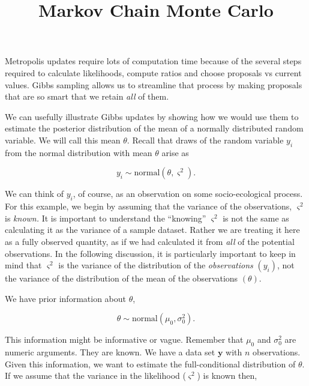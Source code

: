 \documentclass[11pt]{article}
\begin{document}
\title{Markov Chain Monte Carlo}

\maketitle

Metropolis updates require lots of computation time because of the several steps required to calculate likelihoods, compute ratios and choose proposals vs current values. Gibbs sampling allows us to streamline that process by making proposals that are so smart that we retain \emph{all }of them. 

We can usefully illustrate Gibbs updates by showing how we would use them to estimate the posterior distribution of the mean of a normally distributed random variable. We will call this mean $\theta$. Recall that draws of the random variable $y_{i}$ from the normal distribution with mean $\theta$ arise as  

\begin{equation}
y_{i}\sim\text{normal}(\theta,\varsigma^{2}).
\end{equation}

We can think of $y_{i}$, of course, as an observation on some socio-ecological process. For this example, we begin by assuming that the variance of the observations, $\varsigma^{2}$ is \emph{known. }It is important to understand the ``knowing'' $\varsigma^{2}$ is not the same as calculating it as the variance of a sample dataset. Rather we are
treating it here as a fully observed quantity, as if we had calculated it from \emph{all} of the potential observations. In the following discussion, it is particularly important to keep in mind that $\varsigma^{2}$ is the variance of the distribution of the \emph{observations} $\left(y_{i}\right)$, not the variance of the distribution of the mean of the observations
$\left(\theta\right)$.

We have prior information about $\theta$,

\begin{equation}
\theta\sim\text{normal}\left(\mu_{0},\sigma_{0}^{2}\right).
\end{equation}

This information might be informative or vague. Remember that $\mu_{0}$ and $\sigma_{0}^{2}$ are numeric arguments. They are known. We have a data set\textbf{ $\mathbf{y}$ }with $n$ observations. Given this information, we want to estimate the full-conditional distribution of $\theta$. If we assume that the variance in the likelihood ($\varsigma^{2}$) is\emph{ }known\emph{ $ $}then, 
\end{document}
